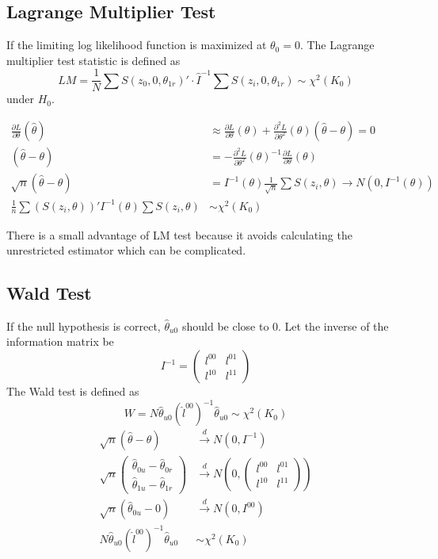 \documentclass[11pt, a4paper, oneside]{article}
\theoremstyle{definition}
\theoremstyle{proposition}
\theoremstyle{corollary}
\theoremstyle{lemma}
\theoremstyle{theorem}
\begin{document}
\subsection{Lagrange Multiplier Test}
If the limiting log likelihood function is maximized at $\theta_0=0$. The Lagrange multiplier test statistic is defined as 
$$LM = \frac{1}{N}\sum S(z_0, 0, \theta_{1r})'\cdot \hat{I}^{-1}\sum S(z_i, 0, \theta_{1r}) \sim \chi^2(K_0)$$ under $H_0$. 

\begin{align*}
\frac{\partial L}{\partial \theta}(\hat{\theta}) &\approx \frac{\partial L}{\partial \theta}(\theta) +  \frac{\partial^2 L}{\partial \theta^2}(\theta)(\hat{\theta} - \theta) = 0\\
(\hat{\theta} - \theta) & = -\frac{\partial^2 L}{\partial \theta^2}(\theta)^{-1} \frac{\partial L}{\partial \theta}(\theta) \\
\sqrt{n}(\hat{\theta} - \theta) &= I^{-1}(\theta)\frac{1}{\sqrt{n}}\sum S(z_i, \theta) \to N(0, I^{-1}(\theta))\\
\frac{1}{n}\sum(S(z_i, \theta))'I^{-1}(\theta)\sum S(z_i, \theta) &\sim \chi^2(K_0)
\end{align*}

There is a small advantage of LM test because it avoids calculating the unrestricted estimator which can be complicated. 

\subsection{Wald Test}
If the null hypothesis is correct, $\hat{\theta}_{u0}$ should be close to 0.  Let the inverse of the information matrix be 
$$I^{-1} = \begin{pmatrix} l^{00} & l^{01} \\ l^{10} & l^{11}\end{pmatrix}$$
The Wald test is defined as $$W = N\hat{\theta}_{u0}(\hat{l}^{00})^{-1}\hat{\theta}_{u0} \sim \chi^2(K_0)$$
\begin{align*}
\sqrt{n}(\hat{\theta}- \theta) &\overset{d}{\to} N(0, I^{-1})\\ 
\sqrt{n}\begin{pmatrix}\hat{\theta}_{0u} - \hat{\theta}_{0r}\\\hat{\theta}_{1u} - \hat{\theta}_{1r}\end{pmatrix}  &\overset{d}{\to} N(0,  \begin{pmatrix} l^{00} & l^{01} \\ l^{10} & l^{11}\end{pmatrix})  \\
\sqrt{n}(\hat{\theta}_{0u} - 0) &\overset{d}{\to} N(0, I^{00}) \\ 
N\hat{\theta}_{u0}(\hat{l}^{00})^{-1}\hat{\theta}_{u0} &\sim \chi^2(K_0)
\end{align*}
\end{document}
